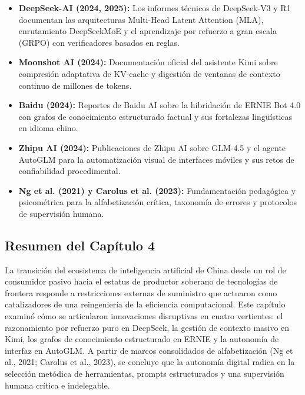 \begin{itemize}[leftmargin=1.5em, itemsep=0.18em, topsep=0.15em]
    \item \textbf{DeepSeek-AI (2024, 2025):} Los informes técnicos de DeepSeek-V3 y R1 documentan las arquitecturas Multi-Head Latent Attention (MLA), enrutamiento DeepSeekMoE y el aprendizaje por refuerzo a gran escala (GRPO) con verificadores basados en reglas.
    \item \textbf{Moonshot AI (2024):} Documentación oficial del asistente Kimi sobre compresión adaptativa de KV-cache y digestión de ventanas de contexto continuo de millones de tokens.
    \item \textbf{Baidu (2024):} Reportes de Baidu AI sobre la hibridación de ERNIE Bot 4.0 con grafos de conocimiento estructurado factual y sus fortalezas lingüísticas en idioma chino.
    \item \textbf{Zhipu AI (2024):} Publicaciones de Zhipu AI sobre GLM-4.5 y el agente AutoGLM para la automatización visual de interfaces móviles y sus retos de confiabilidad procedimental.
    \item \textbf{Ng et al. (2021) y Carolus et al. (2023):} Fundamentación pedagógica y psicométrica para la alfabetización crítica, taxonomía de errores y protocolos de supervisión humana.
\end{itemize}

\newpage
{}

\subsection*{Resumen del Capítulo 4}

La transición del ecosistema de inteligencia artificial de China desde un rol de consumidor pasivo hacia el estatus de productor soberano de tecnologías de frontera responde a restricciones externas de suministro que actuaron como catalizadores de una reingeniería de la eficiencia computacional. Este capítulo examinó cómo se articularon innovaciones disruptivas en cuatro vertientes: el razonamiento por refuerzo puro en DeepSeek, la gestión de contexto masivo en Kimi, los grafos de conocimiento estructurado en ERNIE y la autonomía de interfaz en AutoGLM. A partir de marcos consolidados de alfabetización (Ng et al., 2021; Carolus et al., 2023), se concluye que la autonomía digital radica en la selección metódica de herramientas, prompts estructurados y una supervisión humana crítica e indelegable.

